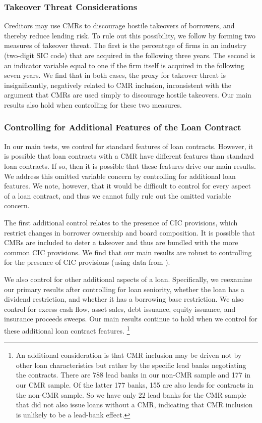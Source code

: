 \documentclass[a4paper,12pt]{article}
\begin{document}
\subsubsection{Takeover Threat Considerations}

Creditors may use CMRs to discourage hostile takeovers of borrowers, and thereby reduce lending risk.
To rule out this possibility, we follow \citet{Agrawal_1998} by forming two measures of takeover threat.
The first is the percentage of firms in an industry (two-digit SIC code) that are acquired in the following three years. The second is an indicator variable equal to one if the firm itself is acquired in the following seven years.
We find that in both cases, the proxy for takeover threat is insignificantly, negatively related to CMR inclusion, inconsistent with the argument that CMRs are used simply to discourage hostile takeovers.
Our main results also hold when controlling for these two measures.




\subsubsection{Controlling for Additional Features of the Loan Contract}

In our main tests, we control for standard features of loan contracts.
However, it is possible that loan contracts with a CMR have different features than standard loan contracts.
If so, then it is possible that these features drive our main results.
We address this omitted variable concern by controlling for additional loan features.
We note, however, that it would be difficult to control for every aspect of a loan contract, and thus we cannot fully rule out the omitted variable concern.


The first additional control relates to the presence of CIC provisions, which restrict changes in borrower ownership and board composition.
It is possible that CMRs are included to deter a takeover and thus are bundled with the more common CIC provisions.
We find that our main results are robust to controlling for the presence of CIC provisions (using data from \citet{akins_2019}).


We also control for other additional aspects of a loan.
Specifically, we reexamine our primary results after controlling for loan seniority, whether the loan has a dividend restriction, and whether it has a borrowing base restriction.
We also control for excess cash flow, asset sales, debt issuance, equity issuance, and insurance proceeds sweeps.
Our main results continue to hold when we control for these additional loan contract features.%
    \footnote{An additional consideration is that CMR inclusion may be driven not by other loan characteristics but rather by the specific lead banks negotiating the contracts.
    There are 788 lead banks in our non-CMR sample and 177 in our CMR sample.
    Of the latter 177 banks, 155 are also leads for contracts in the non-CMR sample.
    So we have only 22 lead banks for the CMR sample that did not also issue loans without a CMR, indicating that CMR inclusion is unlikely to be a lead-bank effect.}
\end{document}
